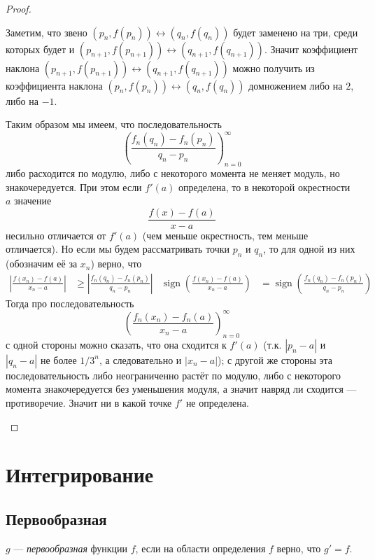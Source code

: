 \documentclass[12pt,a4paper]{article}
\DeclareMathOperator{\sign}{sign}
\begin{document}
\begin{proof}
\begin{enumerate}
                Заметим, что звено $(p_n, f(p_n)) \leftrightarrow (q_n, f(q_n))$ будет заменено на три, среди которых будет и $(p_{n+1}, f(p_{n+1})) \leftrightarrow (q_{n+1}, f(q_{n+1}))$. Значит коэффициент наклона $(p_{n+1}, f(p_{n+1})) \leftrightarrow (q_{n+1}, f(q_{n+1}))$ можно получить из коэффициента наклона $(p_n, f(p_n)) \leftrightarrow (q_n, f(q_n))$ домножением либо на $2$, либо на $-1$.

                Таким образом мы имеем, что последовательность
                \[\left(\frac{f_n(q_n) - f_n(p_n)}{q_n - p_n}\right)_{n=0}^\infty\]
                либо расходится по модулю, либо с некоторого момента не меняет модуль, но знакочередуется. При этом если $f'(a)$ определена, то в некоторой окрестности $a$ значение
                \[\frac{f(x) - f(a)}{x-a}\]
                несильно отличается от $f'(a)$ (чем меньше окрестность, тем меньше отличается). Но если мы будем рассматривать точки $p_n$ и $q_n$, то для одной из них (обозначим её за $x_n$) верно, что
                \begin{align*}
                    \left|\frac{f(x_n) - f(a)}{x_n-a}\right| &\geqslant \left|\frac{f_n(q_n) - f_n(p_n)}{q_n - p_n}\right|&
                    \sign\left(\frac{f(x_n) - f(a)}{x_n-a}\right) &= \sign\left(\frac{f_n(q_n) - f_n(p_n)}{q_n - p_n}\right)
                \end{align*}
                Тогда про последовательность
                \[\left(\frac{f_n(x_n) - f_n(a)}{x_n - a}\right)_{n=0}^\infty\]
                с одной стороны можно сказать, что она сходится к $f'(a)$ (т.к. $|p_n - a|$ и $|q_n - a|$ не более $1/3^n$, а следовательно и $|x_n - a|$); с другой же стороны эта последовательность либо неограниченно растёт по модулю, либо с некоторого момента знакочередуется без уменьшения модуля, а значит навряд ли сходится --- противоречие. Значит ни в какой точке $f'$ не определена.
        \end{enumerate}
    \end{proof}

    \section{Интегрирование}

    \subsection{Первообразная}

    \begin{definition}
        $g$ --- \emph{первообразная} функции $f$, если на области определения $f$ верно, что $g' = f$.
    \end{definition}
\end{document}
